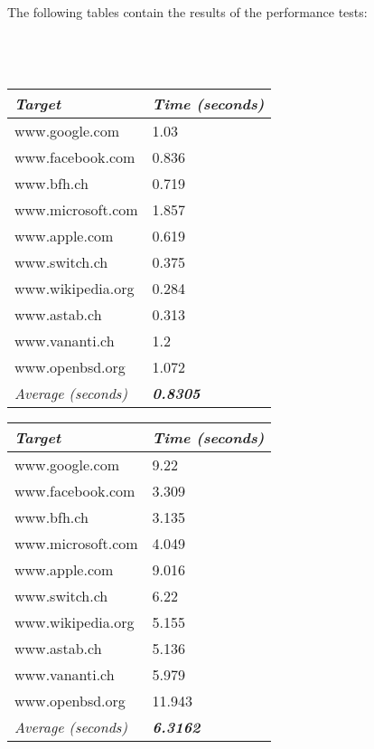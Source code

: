 \documentclass[
	a4paper,					10pt,							twoside,					openright,				notitlepage,			parskip=half,			]{scrreprt}
\begin{document}
The following tables contain the results of the performance tests:\\\\\\\\
\begin{minipage}[H][5cm][b]{0,5\textwidth}
\centering
\begin{tabular}{l|l}
\textit{\textbf{Target}}   & \textit{\textbf{Time (seconds)}} \\ \hline
www.google.com             & 1.03                             \\
www.facebook.com           & 0.836                            \\
www.bfh.ch                 & 0.719                            \\
www.microsoft.com          & 1.857                            \\
www.apple.com              & 0.619                            \\
www.switch.ch              & 0.375                            \\
www.wikipedia.org          & 0.284                            \\
www.astab.ch               & 0.313                            \\
www.vananti.ch             & 1.2                              \\
www.openbsd.org            & 1.072                            \\ \hline
\textit{Average (seconds)} & \textit{\textbf{0.8305}}        
\end{tabular}
 \label{tab:serverInfoTraceTable} 
\end{minipage}
\begin{minipage}[H][5cm][b]{0,5\textwidth}
\centering
\begin{tabular}{l|l}
\textit{\textbf{Target}}   & \textit{\textbf{Time (seconds)}} \\ \hline
www.google.com             & 9.22                             \\
www.facebook.com           & 3.309                            \\
www.bfh.ch                 & 3.135                            \\
www.microsoft.com          & 4.049                            \\
www.apple.com              & 9.016                            \\
www.switch.ch              & 6.22                             \\
www.wikipedia.org          & 5.155                            \\
www.astab.ch               & 5.136                            \\
www.vananti.ch             & 5.979                            \\
www.openbsd.org            & 11.943                           \\ \hline
\textit{Average (seconds)} & \textit{\textbf{6.3162}}        
\end{tabular}
 \label{tab:dnsTraceTable} 
\end{minipage}
\end{document}
